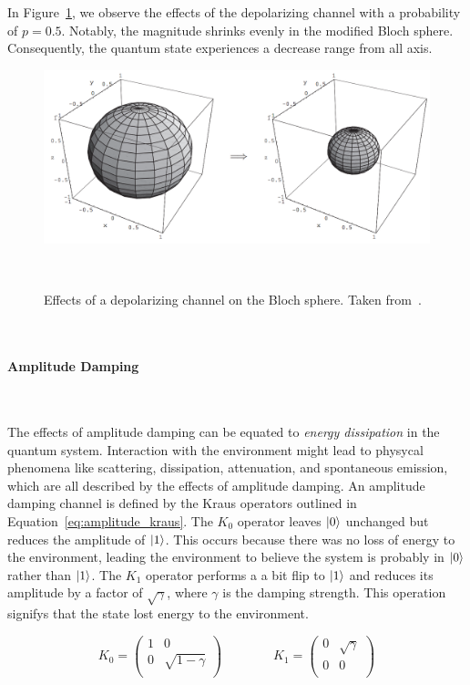 In Figure~\ref{fig:depolarizing_flip}, we observe the effects of the 
depolarizing channel with a probability of \(p=0.5\). Notably, the
magnitude shrinks evenly in the modified Bloch sphere. Consequently,
the quantum state experiences a decrease range from all axis. \

\begin{figure}[h!]
  \includegraphics[scale=0.39]{figures/depolarizing_channel.png}
  \centering
  \caption{Effects of a depolarizing channel on the Bloch sphere. Taken from~\cite{nielsen_quantum_2010}.}
~\label{fig:depolarizing_flip}
\end{figure} \

\paragraph{Amplitude Damping} \

The effects of amplitude damping can be equated to
\textit{energy dissipation} in the quantum system. Interaction with
the environment might lead to physycal phenomena like scattering,
dissipation, attenuation, and spontaneous emission, which are all
described by the effects of amplitude damping. An amplitude
damping channel is defined by the Kraus operators outlined in
Equation~\ref{eq:amplitude_kraus}. The \(K_0\) operator leaves
\(\ket{0}\) unchanged but reduces the amplitude of \(\ket{1}\).
This occurs because there was no loss of energy to the environment,
leading the environment to believe the system is probably in \(\ket{0}\)
rather than \(\ket{1}\). The \(K_1\) operator performs a a bit
flip to \(\ket{1}\) and reduces its amplitude by a factor of
\(\sqrt{\gamma}\), where \(\gamma\) is the damping strength.
This operation signifys that the state lost energy to the
environment. \

\begin{equation}\label{eq:amplitude_kraus}
  K_0 = \begin{pmatrix}
          1 & 0 \\
          0 & \sqrt{1-\gamma} \\
        \end{pmatrix} \qquad \qquad
  K_1 = \begin{pmatrix}
          0 & \sqrt{\gamma} \\
          0 & 0 \\
        \end{pmatrix}
\end{equation} \

